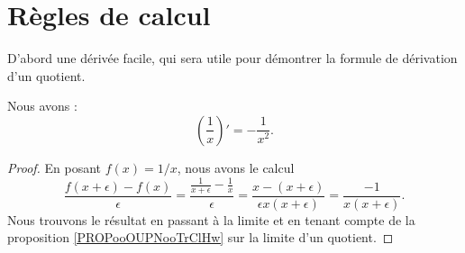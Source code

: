 

\section{Règles de calcul}

D'abord une dérivée facile, qui sera utile pour démontrer la formule de dérivation d'un quotient.
\begin{lemma}
	Nous avons :
	\begin{equation}
		\left( \frac{1}{ x } \right)'=-\frac{1}{ x^2 }.
	\end{equation}
\end{lemma}

\begin{proof}
	En posant \( f(x)=1/x\), nous avons le calcul
	\begin{equation}
		\frac{ f(x+\epsilon)-f(x) }{ \epsilon }=\frac{ \frac{1}{ x+\epsilon }-\frac{1}{ x } }{ \epsilon }=\frac{ x-(x+\epsilon) }{ \epsilon x(x+\epsilon) }=\frac{ -1 }{ x(x+\epsilon) }.
	\end{equation}
	Nous trouvons le résultat en passant à la limite et en tenant compte de la proposition \ref{PROPooOUPNooTrClHw} sur la limite d'un quotient.
\end{proof}


